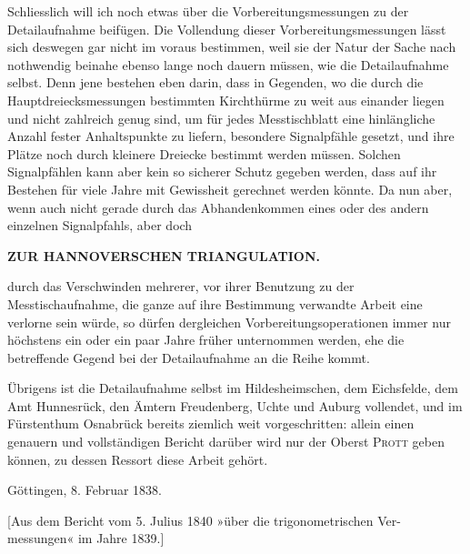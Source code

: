 \par\medskip
\par\noindent\hspace*{\parindent}Schliesslich will ich noch etwas über die Vorbereitungsmessungen zu der Detailaufnahme beifügen. Die Vollendung dieser Vorbereitungsmessungen lässt sich deswegen gar nicht im voraus bestimmen, weil sie der Natur der Sache nach nothwendig beinahe ebenso lange noch dauern müssen, wie die Detailaufnahme selbst. Denn jene bestehen eben darin, dass in Gegenden, wo die durch die Hauptdreiecksmessungen bestimmten Kirchthürme zu weit aus einander liegen und nicht zahlreich genug sind, um für jedes Messtischblatt eine hinlängliche Anzahl fester Anhaltspunkte zu liefern, besondere Signalpfähle gesetzt, und ihre Plätze noch durch kleinere Dreiecke bestimmt werden müssen. Solchen Signalpfählen kann aber kein so sicherer Schutz gegeben werden, dass auf ihr Bestehen für viele Jahre mit Gewissheit gerechnet werden könnte. Da nun aber, wenn auch nicht gerade durch das Abhandenkommen eines oder des andern einzelnen Signalpfahls, aber doch

\par\clearpage
\noindent\null\hfill{\small\textbf{ZUR HANNOVERSCHEN TRIANGULATION.}}\hfill{}\par\medskip

\noindent durch das Verschwinden mehrerer, vor ihrer Benutzung zu der Messtischaufnahme, die ganze auf ihre Bestimmung verwandte Arbeit eine verlorne sein würde, so dürfen dergleichen Vorbereitungsoperationen immer nur höchstens ein oder ein paar Jahre früher unternommen werden, ehe die betreffende Gegend bei der Detailaufnahme an die Reihe kommt.

\par\noindent\hspace*{\parindent}Übrigens ist die Detailaufnahme selbst im Hildesheimschen, dem Eichsfelde, dem Amt Hunnesrück, den Ämtern Freudenberg, Uchte und Auburg vollendet, und im Fürstenthum Osnabrück bereits ziemlich weit vorgeschritten: allein einen genauern und vollständigen Bericht darüber wird nur der Oberst \textsc{Prott} geben können, zu dessen Ressort diese Arbeit gehört.

\par\noindent\hspace*{\parindent}Göttingen, 8. Februar 1838.

\par\medskip
\begin{center}
[Aus dem Bericht vom 5. Julius 1840 »über die trigonometrischen Ver-\\
messungen« im Jahre 1839.]
\end{center}

